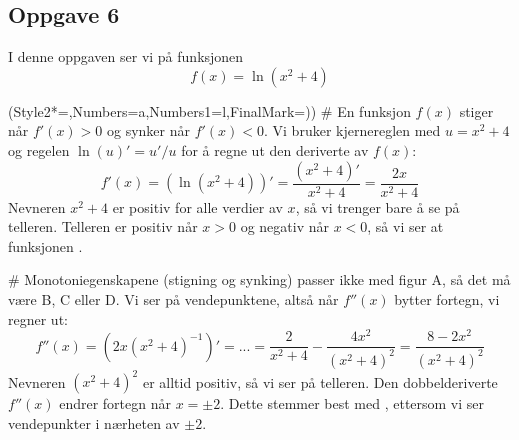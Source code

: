\subsection*{Oppgave 6}
I denne oppgaven ser vi på funksjonen
\begin{equation*}
	f(x) = \ln \left(x^2 + 4\right)
\end{equation*}
\begin{easylist}[enumerate]
	\ListProperties(Style2*=,Numbers=a,Numbers1=l,FinalMark={)})
	# En funksjon $f(x)$ stiger når $f'(x)>0$ og synker når $f'(x)<0$. Vi bruker kjernereglen med $u = x^2 + 4$ og regelen $\ln(u)' = u' / u$ for å regne ut den deriverte av $f(x)$:
	\begin{equation*}
		f'(x) = \left( \ln \left(x^2 + 4\right) \right)' = \frac{\left(x^2 + 4\right)'}{x^2 + 4} =  \frac{2x}{x^2 + 4}
	\end{equation*}
	Nevneren $x^2 + 4$ er positiv for alle verdier av $x$, så vi trenger bare å se på telleren. Telleren er positiv når $x > 0$ og negativ når $x < 0$, så vi ser at funksjonen  .
	
	# Monotoniegenskapene (stigning og synking) passer ikke med figur A, så det må være B, C eller D.
	Vi ser på vendepunktene, altså når $f''(x)$ bytter fortegn, vi regner ut:
	\begin{equation*}
	f''(x) = \left(  2x  \left( x^2 + 4 \right)^{-1}  \right)' = ... = \frac{2}{x^2 + 4} - \frac{4x^2}{\left(x^2 + 4\right)^2} = \frac{ 8 -2x^2}{\left(x^2 + 4\right)^2}
	\end{equation*}
	Nevneren $\left(x^2 + 4\right)^2$ er alltid positiv, så vi ser på telleren. Den dobbelderiverte $f''(x)$ endrer fortegn når $x = \pm 2$. Dette stemmer best med , ettersom vi ser vendepunkter i nærheten av $\pm 2$.
\end{easylist}

